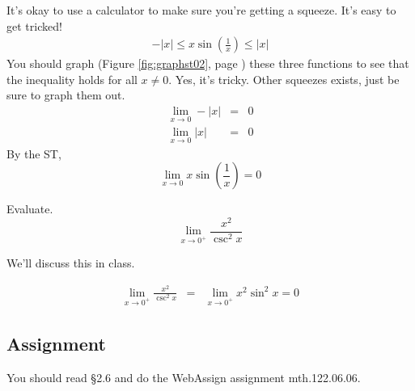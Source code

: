 \documentclass[12pt,addpoints, answers, fleqn]{exam}
\begin{document}
\begin{questions}
\begin{solution}
It's okay to use a calculator to make sure you're getting a squeeze. It's easy to get tricked!
\begin{eqnarray*}
-\left| x \right| \leq x \sin \left( \frac{1}{x} \right) \leq \left| x \right|
\end{eqnarray*}
You should graph (Figure \ref{fig:graphst02}, page \pageref{fig:graphst02}) these three functions to see that the inequality holds for all $x \neq 0$. Yes, it's tricky. Other squeezes exists, just be sure to graph them out.
\begin{eqnarray*}
\lim_{x \to 0} -\left| x \right| &=& 0\\ 
\lim_{x \to 0} \left| x\right| &=& 0
\end{eqnarray*}
By the ST,
\[
\mathop {\lim }\limits_{x \to 0}  x \sin \left( \frac{1}{x} \right) =0
\]
\end{solution}

\question Evaluate.
\[
\mathop {\lim }\limits_{x \to 0^+}  \frac{x^2}{\csc^2 x}
\]

\begin{solution}
We'll discuss this in class.

\begin{eqnarray*}
\lim_{x \to 0^+}  \frac{x^2}{\csc^2 x} &=& \lim_{x \to 0^+}  x^2 \sin^2 x = 0
\end{eqnarray*}

\end{solution}

\end{questions}








 




\subsection{Assignment}
You should read \S  2.6 and do the WebAssign assignment mth.122.06.06.
\vfill
\pagebreak
\end{document}
